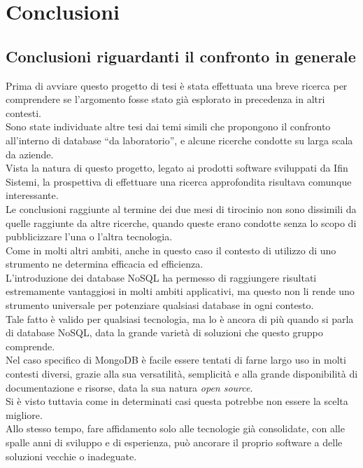 
\chapter{Conclusioni}
\label{cap:conclusioni}
\section{Conclusioni riguardanti il confronto in generale}
Prima di avviare questo progetto di tesi è stata effettuata una breve ricerca per comprendere se l'argomento fosse stato già esplorato in precedenza in altri contesti.\\
Sono state individuate altre tesi dai temi simili che propongono il confronto all'interno di database ``da laboratorio'', e alcune ricerche condotte su larga scala da aziende.\\
Vista la natura di questo progetto, legato ai prodotti software sviluppati da Ifin Sistemi, la prospettiva di effettuare una ricerca approfondita risultava comunque interessante.\\

\noindent Le conclusioni raggiunte al termine dei due mesi di tirocinio non sono dissimili da quelle raggiunte da altre ricerche, quando queste erano condotte senza lo scopo di pubblicizzare l'una o l'altra tecnologia.\\
Come in molti altri ambiti, anche in questo caso il contesto di utilizzo di uno strumento ne determina efficacia ed efficienza.\\
L'introduzione dei database NoSQL ha permesso di raggiungere risultati estremamente vantaggiosi in molti ambiti applicativi, ma questo non li rende uno strumento universale per potenziare qualsiasi database in ogni contesto.\\
Tale fatto è valido per qualsiasi tecnologia, ma lo è ancora di più quando si parla di database NoSQL, data la grande varietà di soluzioni che questo gruppo comprende.\\
Nel caso specifico di MongoDB è facile essere tentati di farne largo uso in molti contesti diversi, grazie alla sua versatilità, semplicità e alla grande disponibilità di documentazione e risorse, data la sua natura \textit{open source}.\\
Si è visto tuttavia come in determinati casi questa potrebbe non essere la scelta migliore.\\
Allo stesso tempo, fare affidamento solo alle tecnologie già consolidate, con alle spalle anni di sviluppo e di esperienza, può ancorare il proprio software a delle soluzioni vecchie o inadeguate.\\

